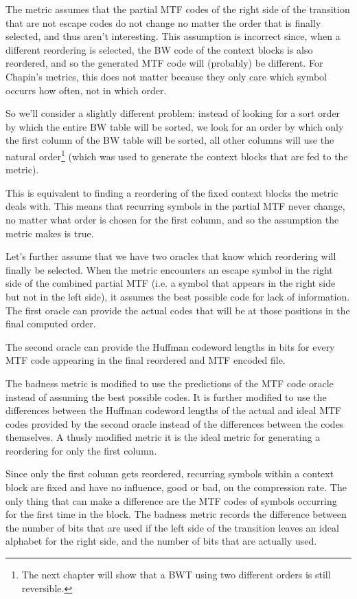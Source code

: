 \documentclass[a4paper]{scrreprt}
\begin{document}
The metric assumes that the partial MTF codes of the right side of the
transition that are not escape codes do not change no matter the order that is
finally selected, and thus aren't interesting. This assumption is incorrect
since, when a different reordering is selected, the BW code of the context
blocks is also reordered, and so the generated MTF code will (probably) be
different. For Chapin's metrics, this does not matter because they only care
which symbol occurrs how often, not in which order.

So we'll consider a slightly different problem: instead of looking for a sort
order by which the entire BW table will be sorted, we look for an order by which
only the first column of the BW table will be sorted, all other columns will use
the natural order\footnote{The next chapter will show that a BWT using two
different orders is still reversible.} (which was used to generate the
context blocks that are fed to the metric).

This is equivalent to finding a reordering of the fixed context blocks the
metric deals with. This means that recurring symbols in the partial MTF never
change, no matter what order is chosen for the first column, and so the
assumption the metric makes is true.

Let's further assume that we have two oracles that know which reordering will
finally be selected. When the metric encounters an escape symbol in the right
side of the combined partial MTF (i.e. a symbol that appears in the right side
but not in the left side), it assumes the best possible code for lack of
information. The first oracle can provide the actual codes that will be at those
positions in the final computed order.

The second oracle can provide the Huffman codeword lengths in bits for every MTF
code appearing in the final reordered and MTF encoded file.

The badness metric is modified to use the predictions of the MTF code oracle
instead of assuming the best possible codes. It is further modified to use the
differences between the Huffman codeword lengths of the actual and ideal MTF
codes provided by the second oracle instead of the differences between the
codes themselves. A thusly modified metric it is the ideal metric for generating
a reordering for only the first column.

Since only the first column gets reordered, recurring symbols within a context
block are fixed and have no influence, good or bad, on the compression rate. The
only thing that can make a difference are the MTF codes of symbols occurring for
the first time in the block. The badness metric records the difference between
the number of bits that are used if the left side of the transition leaves an
ideal alphabet for the right side, and the number of bits that are actually used.
\end{document}
